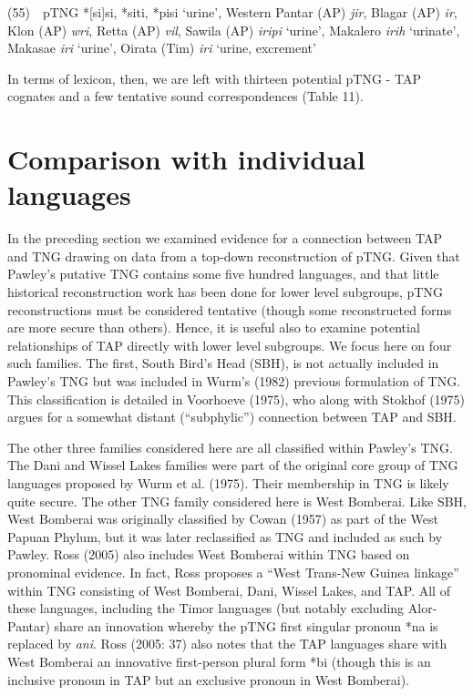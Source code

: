 (55)\ \ pTNG *[si]si, *siti, *pisi {\textquoteleft}urine{\textquoteright}, Western Pantar (AP) \textit{jir}, Blagar (AP) \textit{ir}, Klon (AP) \textit{wri}, Retta (AP) \textit{vil}, Sawila (AP) \textit{iripi{\ng}} {\textquoteleft}urine{\textquoteright}, Makalero \textit{irih }{\textquoteleft}urinate{\textquoteright}, Makasae \textit{iri }{\textquoteleft}urine{\textquoteright}, Oirata (Tim) \textit{iri} {\textquoteleft}urine, excrement{\textquoteright}

In terms of lexicon, then, we are left with thirteen potential pTNG - TAP cognates and a few tentative sound correspondences (Table 11). 

\section[Comparison with individual languages]{Comparison with individual languages}
\hypertarget{RefHeading72080871885726}{}In the preceding section we examined evidence for a connection between TAP and TNG drawing on data from a top-down reconstruction of pTNG. Given that Pawley{\textquoteright}s putative TNG contains some five hundred languages, and that little historical reconstruction work has been done for lower level subgroups, pTNG reconstructions must be considered tentative (though some reconstructed forms are more secure than others). Hence, it is useful also to examine potential relationships of TAP directly with lower level subgroups. We focus here on four such families. The first, South Bird{\textquoteright}s Head (SBH), is not actually included in Pawley{\textquoteright}s TNG but was included in Wurm{\textquoteright}s (1982) previous formulation of TNG. This classification is detailed in Voorhoeve (1975), who along with Stokhof (1975) argues for a somewhat distant ({\textquotedblleft}subphylic{\textquotedblright}) connection between TAP and SBH.  

The other three families considered here are all classified within Pawley{\textquoteright}s TNG. The Dani and Wissel Lakes families were part of the original core group of TNG languages proposed by Wurm et al. (1975). Their membership in TNG is likely quite secure. The other TNG family considered here is West Bomberai. Like SBH, West Bomberai was originally classified by Cowan (1957) as part of the West Papuan Phylum, but it was later reclassified as TNG and included as such by Pawley. Ross (2005) also includes West Bomberai within TNG based on pronominal evidence. In fact, Ross proposes a {\textquotedblleft}West Trans-New Guinea linkage{\textquotedblright} within TNG consisting of West Bomberai, Dani, Wissel Lakes, and TAP. All of these languages, including the Timor languages (but notably excluding Alor-Pantar) share an innovation whereby the pTNG first singular pronoun *na is replaced by \textit{ani}. Ross (2005: 37) also notes that the TAP languages share with West Bomberai an innovative first-person 
plural form *bi (though this is an inclusive pronoun in TAP but an exclusive pronoun in West Bomberai). 

